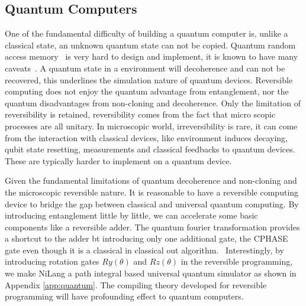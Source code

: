 \documentclass[aps,twocolumn,longbibliography,english,superscriptaddress,prr]{revtex4-1}
\newcommand{\<}{\langle}
\renewcommand{\>}{\rangle}
\newcommand{\App}[1]{Appendix \ref{#1}}
\theoremstyle{definition}\newtheorem{definition}{\textit{Definition}}
\begin{document}
\subsection{Quantum Computers}\label{sec:qc}
One of the fundamental difficulty of building a quantum computer is, unlike a classical state, an unknown quantum state can not be copied.
Quantum random access memory~\cite{} is very hard to design and implement, it is known to have many caveats~\cite{Scott}.
A quantum state in a environment will decoherence and can not be recovered, this underlines the simulation nature of quantum devices.
Reversible computing does not enjoy the quantum advantage from entanglement, nor the quantum disadvantages from non-cloning and decoherence.
Only the limitation of reversibility is retained, reversibility comes from the fact that micro scopic processes are all unitary.
In microscopic world, irreversibility is rare, it can come from the interaction with classical devices, like environment induces decaying, qubit state resetting, measurements and classical feedbacks to quantum devices. These are typically harder to implement on a quantum device.

Given the fundamental limitations of quantum decoherence and non-cloning and the microscopic reversible nature.
It is reasonable to have a reversible computing device to bridge the gap between classical and universal quantum computing.
By introducing entanglement little by little, we can accelerate some basic components like a reversible adder.
The quantum fourier transformation provides a shortcut to the adder bt introducing only one additional gate, the CPHASE gate even though it is a classical in classical out algorithm.~\cite{} Interestingly, by introducing rotation gates $Ry(\theta)$ and $Rz(\theta)$ in the reversible programming, we make NiLang a path integral based universal quantum simulator as shown in \App{app:quantum}. The compiling theory developed for reversible programming will have profounding effect to quantum computers.
\end{document}
